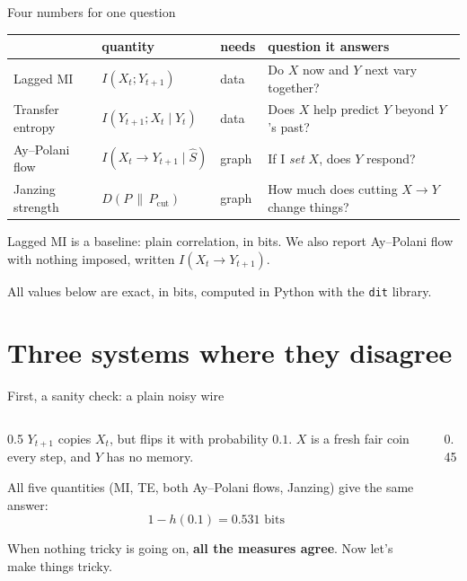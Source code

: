 \documentclass[aspectratio=169,11pt,xcolor={table}]{beamer}
\newcommand{\Xt}{X_t}
\newcommand{\Yt}{Y_t}
\newcommand{\Yn}{Y_{t+1}}
\newcommand{\bits}{\text{ bits}}
\begin{document}
\begin{frame}{Four numbers for one question}
  \centering\small
  \renewcommand{\arraystretch}{1.35}
  \begin{tabular}{@{}llll@{}}
    \toprule
    & \textbf{quantity} & \textbf{needs} & \textbf{question it answers} \\
    \midrule
    Lagged MI        & $I(\Xt;\Yn)$                 & data  & Do $X$ now and $Y$ next vary together? \\
    Transfer entropy & $I(\Yn;\Xt \mid \Yt)$         & data  & Does $X$ help predict $Y$ beyond $Y$'s past? \\
    Ay--Polani flow  & $I(\Xt \to \Yn \mid \hat S)$ & graph & If I \emph{set} $X$, does $Y$ respond? \\
    Janzing strength & $D(P\,\|\,P_{\text{cut}})$  & graph & How much does cutting $X \to Y$ change things? \\
    \bottomrule
  \end{tabular}
  \bigskip

  \raggedright\normalsize
  Lagged MI is a baseline: plain correlation, in bits.
  We also report Ay--Polani flow with nothing imposed, written $I(\Xt \to \Yn)$.
  \medskip

  All values below are exact, in bits, computed in Python with the \texttt{dit} library.
\end{frame}

\section{Three systems where they disagree}

\begin{frame}{First, a sanity check: a plain noisy wire}
  \begin{columns}[c]
    \begin{column}{0.5\textwidth}
      $\Yn$ copies $\Xt$, but flips it with probability $0.1$.
      $X$ is a fresh fair coin every step, and $Y$ has no memory.
      \bigskip

      All five quantities (MI, TE, both Ay--Polani flows, Janzing) give the same answer:
      \[ 1 - h(0.1) = 0.531 \bits \]
      \par\medskip
      When nothing tricky is going on, \textbf{all the measures agree}. Now let's make things tricky.
    \end{column}
    \begin{column}{0.45\textwidth}
      \centering
    \end{column}
  \end{columns}
\end{frame}
\end{document}
